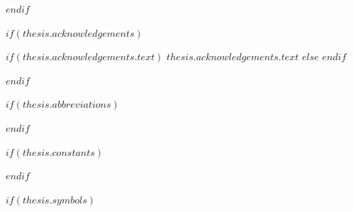 \begin{abstract}
\addchaptertocentry{\abstractname} %
\noindent $abstract$

$if(keywords)$
\vspace{1.5cm}
\noindent\textbf{Keywords:} $for(keywords)$$keywords$$sep$, $endfor$
$endif$
\end{abstract}

$endif$

$if(thesis.acknowledgements)$

\begin{acknowledgements}
\addchaptertocentry{\acknowledgementname} %
$if(thesis.acknowledgements.text)$
\noindent $thesis.acknowledgements.text$
$else$
\noindent
$endif$
\end{acknowledgements}

$endif$


\begingroup
\hypersetup{linkcolor=$if(toclinkcolor)$$toclinkcolor$$else$black$endif$}

\tableofcontents %

\listoffigures %

\listoftables %

\endgroup


$if(thesis.abbreviations)$

\clearpage


$endif$

$if(thesis.constants)$

\clearpage


$endif$

$if(thesis.symbols)$

